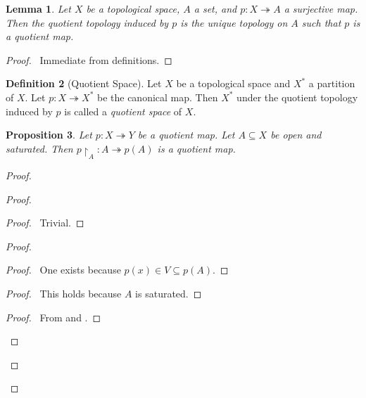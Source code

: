 \documentclass{report}
\let\qed\relax
\newtheorem{lm}{Lemma}[section]
\newtheorem{prop}[lm]{Proposition}
\theoremstyle{definition}
\newtheorem{df}[lm]{Definition}
\begin{document}
  \begin{lm}
    Let $X$ be a topological space, $A$ a set, and $p : X \twoheadrightarrow A$
    a surjective map. Then the quotient topology induced by $p$ is the
    unique topology on $A$ such that $p$ is a quotient map.
  \end{lm}

  \begin{proof}
    \pf\ Immediate from definitions. \qed
  \end{proof}

  \begin{df}[Quotient Space]
    Let $X$ be a topological space and $X^*$ a partition of $X$. Let $p : X
    \twoheadrightarrow X^*$ be the canonical map. Then $X^*$ under the quotient
    topology induced by $p$ is called a \emph{quotient space} of $X$.
  \end{df}

  \begin{prop}
    Let $p : X \twoheadrightarrow Y$ be a quotient map. Let $A \subseteq X$ be
    open and saturated. Then $p \restriction_A : A \twoheadrightarrow p(A)$ is
    a
    quotient map.
  \end{prop}

  \begin{proof}
    \pf
    \begin{proof}
      \begin{proof}
        \pf\ Trivial.
      \end{proof}
      \begin{proof}
        \begin{proof}
          \pf\ One exists because $p(x) \in V \subseteq p(A)$.
        \end{proof}
        \begin{proof}
          \pf\ This holds because $A$ is saturated.
        \end{proof}
        \begin{proof}
          \pf\ From  and .
        \end{proof}
      \end{proof}
    \end{proof}
    \qed
  \end{proof}
\end{document}

